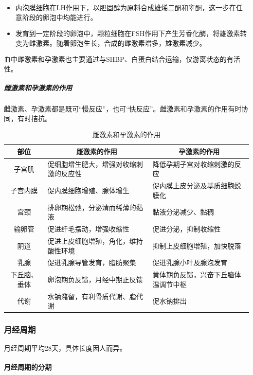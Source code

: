 \begin{itemize}
	\item 内泡膜细胞在LH作用下，以胆固醇为原料合成雄烯二酮和睾酮，这一步在任意阶段的卵泡中均能进行。
	\item 发育到一定阶段的卵泡中，颗粒细胞在FSH作用下产生芳香化酶，将雄激素转变为雌激素。随着卵泡生长，合成的雌激素增多，雄激素减少。
\end{itemize}

血中雌激素和孕激素也主要通过与SHBP、白蛋白结合运输，仅游离状态的有活性。

\subparagraph{雌激素和孕激素的作用}

雌激素、孕激素都是既可“慢反应”，也可“快反应”。雌激素和孕激素的作用有时协同，有时拮抗。

\begin{table}[htbp]
	\centering
	\begin{tabularx}{\textwidth}{|c|X|X|}
		\hline
		部位 & \multicolumn{1}{c|}{雌激素的作用} & \multicolumn{1}{c|}{孕激素的作用} \\ \hline
		子宫肌 & 促细胞增生肥大，增强对收缩刺激的反应性 & 降低孕期子宫对收缩刺激的反应 \\ \hline
		子宫内膜 & 促内膜细胞增殖、腺体增生 & 促内膜上皮分泌及基质细胞蜕膜化 \\ \hline
		宫颈 & 排卵期松弛，分泌清而稀薄的黏液 & 黏液分泌减少、黏稠 \\ \hline
		输卵管 & 促进纤毛摆动，增强收缩性 & 促进分泌，抑制收缩性 \\ \hline
		阴道 & 促进上皮细胞增殖，角化，维持酸性环境 & 抑制上皮细胞增殖，加快脱落 \\ \hline
		乳腺 & 促进乳腺导管发育，脂肪聚集 & 促进乳腺小叶及腺泡发育 \\ \hline
		下丘脑、垂体 & 卵泡期负反馈，月经中期正反馈 & 黄体期负反馈，兴奋下丘脑体温调节中枢 \\ \hline
		代谢 & 水钠潴留，有利骨质代谢、脂代谢 & 促水钠排出 \\ \hline
	\end{tabularx}
	\caption{雌激素和孕激素的作用}
	\label{tab:my-table}
\end{table}

\subsubsection{月经周期}

月经周期平均28天，具体长度因人而异。

\paragraph{月经周期的分期}

